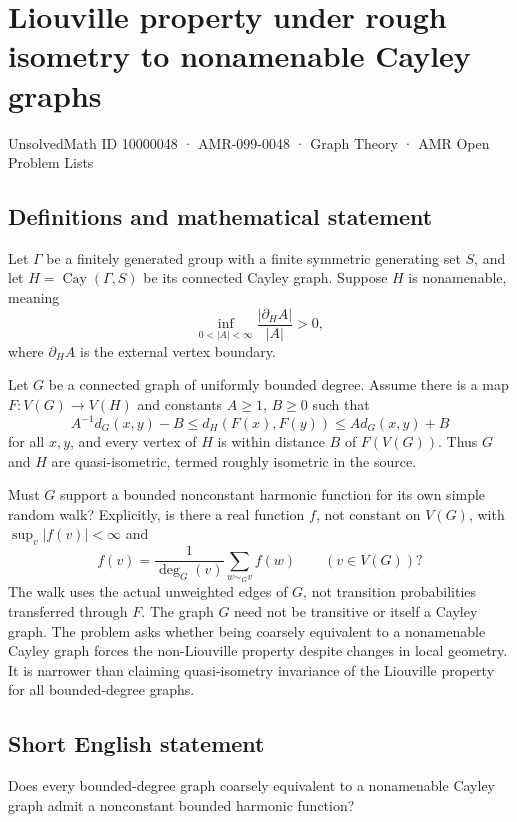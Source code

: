 \documentclass[11pt,a4paper]{article}
\begin{document}
\section*{Liouville property under rough isometry to nonamenable Cayley graphs}\label{10000048}
{\small UnsolvedMath ID 10000048 · AMR-099-0048 · Graph Theory · AMR Open Problem Lists}
\subsection{Definitions and mathematical statement}
Let $\Gamma$ be a finitely generated group with a finite symmetric generating set $S$, and let $H=\operatorname{Cay}(\Gamma,S)$ be its connected Cayley graph. Suppose $H$ is nonamenable, meaning
\[
\inf_{0<|A|<\infty}\frac{|\partial_H A|}{|A|}>0,
\]
where $\partial_H A$ is the external vertex boundary.

Let $G$ be a connected graph of uniformly bounded degree. Assume there is a map $F:V(G)\to V(H)$ and constants $A\ge1$, $B\ge0$ such that
\[
A^{-1}d_G(x,y)-B\le d_H(F(x),F(y))\le A d_G(x,y)+B
\]
for all $x,y$, and every vertex of $H$ is within distance $B$ of $F(V(G))$. Thus $G$ and $H$ are quasi-isometric, termed roughly isometric in the source.

Must $G$ support a bounded nonconstant harmonic function for its own simple random walk? Explicitly, is there a real function $f$, not constant on $V(G)$, with $\sup_v|f(v)|<\infty$ and
\[
f(v)=\frac1{\deg_G(v)}\sum_{w\sim_Gv}f(w)\qquad(v\in V(G))?
\]
The walk uses the actual unweighted edges of $G$, not transition probabilities transferred through $F$. The graph $G$ need not be transitive or itself a Cayley graph. The problem asks whether being coarsely equivalent to a nonamenable Cayley graph forces the non-Liouville property despite changes in local geometry. It is narrower than claiming quasi-isometry invariance of the Liouville property for all bounded-degree graphs.
\subsection{Short English statement}
Does every bounded-degree graph coarsely equivalent to a nonamenable Cayley graph admit a nonconstant bounded harmonic function?
\end{document}
